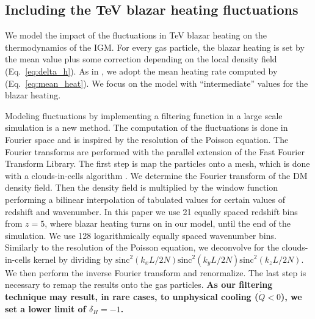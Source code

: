 \documentclass[numberedappendix]{emulateapj}
\newcommand\ALc[1]{{\color{red} \bf #1}} %
\begin{document}
\subsection{Including the TeV blazar heating fluctuations}
We model the impact of the fluctuations in TeV blazar heating on the thermodynamics of the IGM. For every gas particle, the blazar heating is set by the mean value plus some correction depending on the local density field (Eq.~\eqref{eq:delta_h}). As in \citet{2012MNRAS.423..149P}, we adopt the mean heating rate computed by \citet{2012ApJ...752...23C} (Eq.~\eqref{eq:mean_heat}). We focus on the model with ``intermediate'' values for the blazar heating.

Modeling fluctuations by implementing a filtering function in a large scale simulation is a new method. The computation of the fluctuations is done in Fourier space and is inspired by the resolution of the Poisson equation. The Fourier transforms are performed with the parallel extension of the Fast Fourier Transform Library. The first step is map the particles onto a mesh, which is done with a clouds-in-cells algorithm \citep{1981csup.book.....H}. We determine the Fourier transform of the DM density field. Then the density field is multiplied by the window function performing a bilinear interpolation of tabulated values for certain values of redshift and wavenumber. In this paper we use 21 equally spaced redshift bins from $z=5$, where blazar heating turns on in our model, until the end of the simulation. We use 128 logarithmically equally spaced wavenumber bins. Similarly to the resolution of the Poisson equation, we deconvolve for the clouds-in-cells kernel by dividing by $\mathrm{sinc}^2(k_x L/2N)\mathrm{sinc}^2(k_y L/2N)\mathrm{sinc}^2(k_z L/2N)$. We then perform the inverse Fourier transform and renormalize. The last step is necessary to remap the results onto the gas particles. \ALc{As our filtering technique may result, in rare cases, to unphysical cooling ($\dot{Q}< 0$), we set a lower limit of  $\delta_H =-1$.}
\end{document}
